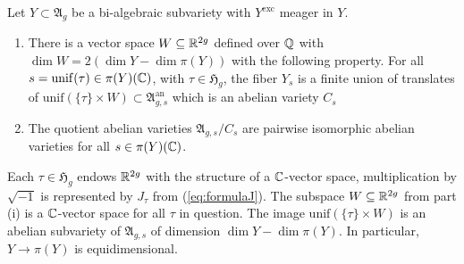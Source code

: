 \documentclass[12pt,oneside]{amsart}
\begin{document}
\begin{proposition}
  \label{prop:monodromyaction}
  Let $Y\subset\mathfrak{A}_g$ be a bi-algebraic subvariety with
  $Y^{\mathrm{exc}}$ meager in $Y$.
  \begin{enumerate}
  \item [(i)]
    There is a vector space $W\subseteq{\mathbb{R}}^{2g}$ defined over ${\mathbb{Q}}$ with
    $\dim W = 2(\dim Y - \dim\pi(Y))$ with the following property. 
    For 
    all $s=\mathrm{unif}(\tau)\in \pi(Y)({\mathbb{C}})$, with $\tau\in\mathfrak{H}_g$, the fiber $Y_s$ is a finite union of
    translates of  $\mathrm{unif}(\{\tau\}\times W) \subset
    \mathfrak{A}_{g,s}^{\mathrm{an}}$ which is an abelian variety $C_s$
  \item[(ii)]
    The quotient abelian varieties $\mathfrak{A}_{g,s}/C_s$ are pairwise isomorphic abelian
    varieties for all $s\in\pi(Y)({\mathbb{C}})$.    
  \end{enumerate}
\end{proposition}
Each $\tau \in \mathfrak{H}_g$ %
endows ${\mathbb{R}}^{2g}$ with the structure of a ${\mathbb{C}}$-vector space,
multiplication by $\sqrt{-1}$ is represented by $J_\tau$ from (\ref{eq:formulaJ}). The
subspace $W\subseteq{\mathbb{R}}^{2g}$ from part (i) is a ${\mathbb{C}}$-vector space for
all $\tau$ in question. The image  $\mathrm{unif}(\{\tau\}\times W)$
is an abelian subvariety of $\mathfrak{A}_{g,s}$ of dimension $\dim Y
- \dim \pi(Y)$. In particular, $Y\rightarrow\pi(Y)$ is
equidimensional.
\end{document}

